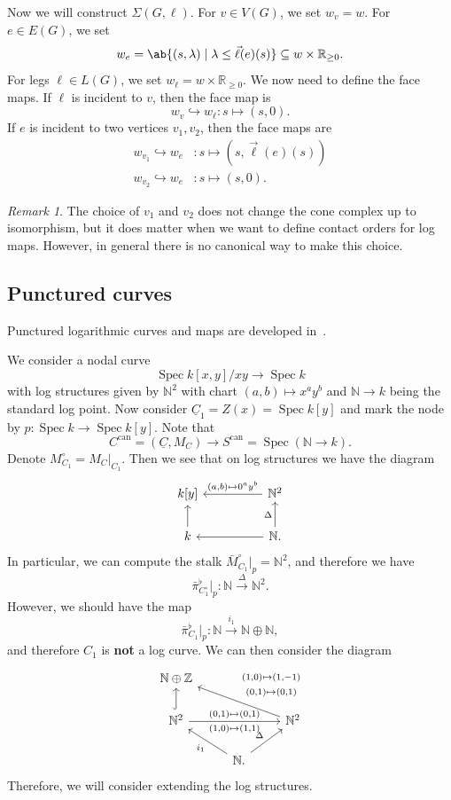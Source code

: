 \documentclass{amsart}
\theoremstyle{definition}
\theoremstyle{remark}
\newtheorem{rmk}[thm]{Remark}
\theoremstyle{plain}
\theoremstyle{definition}
\theoremstyle{remark}
\newcommand{\N}{\mathbb{N}}
\newcommand{\R}{\mathbb{R}}
\newcommand{\Z}{\mathbb{Z}}
\newcommand{\on}[1]{\operatorname{#1}}
\newcommand{\ul}[1]{\underline{#1}}
\newcommand{\1}{\mathbf{1}}
\newcommand{\2}{\mathbf{2}}
\newcommand{\3}{\mathbf{3}}
\DeclareMathOperator{\Spec}{Spec}
\begin{document}
Now we will construct \(\Sigma(G, \ell)\). For \(v \in V(G)\), we set \(w_v = w\). For \(e \in E(G)\), we set
\[ w_e = \ab\{ (s, \lambda) \mid \lambda \leq \vec{\ell}(e)(s) \} \subseteq w \times \R_{\geq 0}. \]
For legs \(\ell \in L(G)\), we set \(w_{\ell} = w \times \R_{\geq 0}\). We now need to define the face maps. If \(\ell\) is incident to \(v\), then the face map is
\[ w_v \hookrightarrow w_{\ell} \colon s \mapsto (s, 0). \]
If \(e\) is incident to two vertices \(v_1, v_2\), then the face maps are
\begin{align*}
    w_{v_1} \hookrightarrow w_e &\colon s \mapsto (s, \vec{\ell}(e)(s)) \\
    w_{v_2} \hookrightarrow w_e & \colon s \mapsto (s, 0).
\end{align*}
\begin{rmk}
    The choice of \(v_1\) and \(v_2\) does not change the cone complex up to isomorphism, but it does matter when we want to define contact orders for log maps. However, in general there is no canonical way to make this choice.
\end{rmk}

\subsection{Punctured curves}%
\label{sub:Punctured curves}

Punctured logarithmic curves and maps are developed in~\cite{ACGS2025}.

We consider a nodal curve
\[ \Spec k[x,y]/xy \to \Spec k \]
with log structures given by \(\N^2\) with chart \((a,b) \mapsto x^a y^b\) and \(\N \to k\) being the standard log point. Now consider \(\ul{C}_1 = Z(x) = \Spec k[y]\) and mark the node by \(p \colon \Spec k \to \Spec k[y]\). Note that
\[ C^{\on{can}} = (\ul{C}, M_C) \to S^{\on{can}} = \Spec(\N \to k). \]
Denote \(M_{C_1}^{\circ} = M_C|_{C_1}\). Then we see that on log structures we have the diagram
\begin{equation*}
\begin{tikzcd}
    k[y] & & \N^2 \ar{ll}[swap]{(a,b) \mapsto 0^a y^b} \\
    k \ar{u} & & \N \ar{ll} \ar{u}{\Delta}.
\end{tikzcd}
\end{equation*}
In particular, we can compute the stalk \(\bar{M}_{C_1}^{\circ}|_p = \N^2\), and therefore we have
\[ \bar{\pi}_{C_1^{\circ}}^{\flat} |_p \colon \N \xrightarrow{\Delta} \N^2. \]
However, we should have the map
\[ \bar{\pi}^{\flat}_{C_1}|_p \colon \N \xrightarrow{i_1} \N \oplus \N, \]
and therefore \(C_1\) is \textbf{not} a log curve. We can then consider the diagram
\begin{equation*}
\begin{tikzcd}
    \N \oplus \Z \\
    \N^2 \ar[hookrightarrow]{u} \ar{rr}{(0,1)\mapsto (0,1)}[swap]{(1,0)\mapsto (1,1)} & & \N^2 \ar{ull}[swap]{\Vectorstack{{(1,0)\mapsto(1,-1)} {(0,1)\mapsto(0,1)}}} \\
    & \N \ar{ul}{i_1} \ar{ur}{\Delta}.
\end{tikzcd}
\end{equation*}
Therefore, we will consider extending the log structures.
\end{document}
